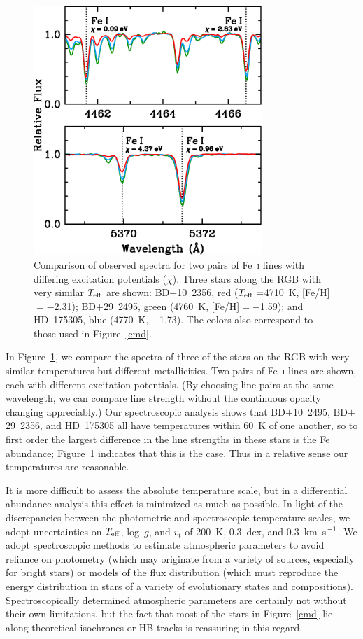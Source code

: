 \documentclass{emulateapj}
\def\kmsec{\mbox{km~s$^{\rm -1}$}}
\begin{document}
\begin{figure}
\includegraphics[angle=0,width=3.4in]{fig03.eps}
\caption{
\label{specplot}
Comparison of observed spectra for two pairs of Fe~\textsc{i} lines 
with differing excitation potentials ($\chi$).
Three stars along the RGB with very similar $T_{\rm eff}$ are shown:
\mbox{BD$+$10~2356}, red ($T_{\rm eff}=$4710~K, [Fe/H]$= -$2.31);
\mbox{BD$+$29~2495}, green (4760~K, [Fe/H]$= -$1.59); and
\mbox{HD~175305}, blue (4770~K, $-$1.73).
The colors also correspond to those used in Figure~\ref{cmd}.
}
\end{figure}


In Figure~\ref{specplot}, we compare the spectra of three
of the stars on the RGB with very similar temperatures
but different metallicities.
Two pairs of Fe~\textsc{i} lines are shown, each 
with different excitation potentials.
(By choosing line pairs at the same wavelength, we 
can compare line strength without the continuous opacity
changing appreciably.)
Our spectroscopic analysis shows that \mbox{BD$+$10~2495},
\mbox{BD$+$29~2356}, and \mbox{HD~175305} all have temperatures
within 60~K of one another, so to first order the largest difference
in the line strengths in these stars is the Fe abundance;
Figure~\ref{specplot} indicates that this is the case.
Thus in a relative sense our temperatures are reasonable.

It is more difficult to assess the absolute temperature scale,
but in a differential abundance analysis this effect is minimized
as much as possible.
In light of the discrepancies between the photometric and
spectroscopic temperature scales, 
we adopt uncertainties on $T_{\rm eff}$, log~$g$, and
$v_{t}$ of 200~K, 0.3~dex, and 0.3~\kmsec.
We adopt spectroscopic methods to estimate atmospheric parameters to avoid
reliance on photometry (which may originate from a variety of 
sources, especially for bright stars) 
or models of the flux distribution (which must reproduce the 
energy distribution in stars of a variety of evolutionary states
and compositions).
Spectroscopically determined atmospheric parameters are certainly
not without their own limitations, 
but the fact that most of the stars in Figure~\ref{cmd} lie along
theoretical isochrones or HB tracks is reassuring in this regard.
\end{document}
